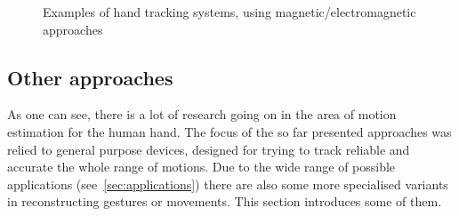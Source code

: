 \begin{figure}[h]
	\hfill
	
	\caption{Examples of hand tracking systems, using magnetic/electromagnetic approaches}
	\label{fig:examplesMagnetic}
\end{figure}

\FloatBarrier
\subsection{Other approaches} \label{subsec:approaches:other}
As one can see, there is a lot of research going on in the area of motion estimation for the human hand. The focus of the so far presented approaches was relied to general purpose devices, designed for trying to track reliable and accurate the whole range of motions. Due to the wide range of possible applications (see~\ref{sec:applications}) there are also some more specialised variants in reconstructing gestures or movements. This section introduces some of them.

